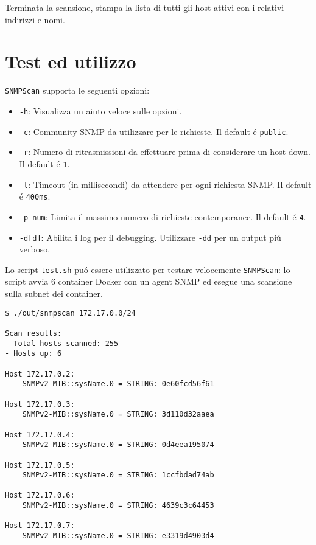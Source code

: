 \documentclass{article}
\providecommand{\inlinecode}[1]{\texttt{#1}}
\begin{document}
Terminata la scansione, stampa la lista di tutti gli host attivi con i relativi indirizzi e nomi.



\section{Test ed utilizzo}

\inlinecode{SNMPScan} supporta le seguenti opzioni:

\begin{itemize}
\item \inlinecode{-h}: Visualizza un aiuto veloce sulle opzioni.
\item \inlinecode{-c}: Community SNMP da utilizzare per le richieste.
      Il default \'{e} \inlinecode{public}.
\item \inlinecode{-r}: Numero di ritrasmissioni da effettuare prima di considerare un host down.
      Il default \'{e} \inlinecode{1}.
\item \inlinecode{-t}: Timeout (in millisecondi) da attendere per ogni richiesta SNMP.
      Il default \'{e} \inlinecode{400ms}.
\item \inlinecode{-p num}: Limita il massimo numero di richieste contemporanee.
      Il default \'{e} \inlinecode{4}.
\item \inlinecode{-d[d]}: Abilita i log per il debugging.
      Utilizzare \inlinecode{-dd} per un output pi\'{u} verboso.
\end{itemize}

Lo script \inlinecode{test.sh} pu\'{o} essere utilizzato per testare velocemente \inlinecode{SNMPScan}:
lo script avvia 6 container Docker con un agent SNMP ed esegue una scansione sulla subnet dei container.

\begin{lstlisting}
$ ./out/snmpscan 172.17.0.0/24

Scan results:
- Total hosts scanned: 255
- Hosts up: 6

Host 172.17.0.2:
    SNMPv2-MIB::sysName.0 = STRING: 0e60fcd56f61

Host 172.17.0.3:
    SNMPv2-MIB::sysName.0 = STRING: 3d110d32aaea

Host 172.17.0.4:
    SNMPv2-MIB::sysName.0 = STRING: 0d4eea195074

Host 172.17.0.5:
    SNMPv2-MIB::sysName.0 = STRING: 1ccfbdad74ab

Host 172.17.0.6:
    SNMPv2-MIB::sysName.0 = STRING: 4639c3c64453

Host 172.17.0.7:
    SNMPv2-MIB::sysName.0 = STRING: e3319d4903d4
\end{lstlisting}
\end{document}
